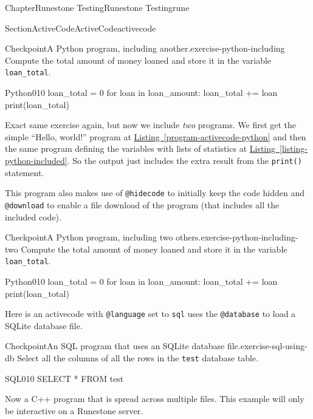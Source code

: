 \documentclass[oneside,10pt,]{book}
\newcommand{\xreffont}{\relax}
\newcommand{\mono}[1]{\texttt{#1}}
\numberwithin{equation}{section}
\begin{document}
\begin{chapterptx}{Chapter}{Runestone Testing}{}{Runestone Testing}{}{}{rune}
\begin{sectionptx}{Section}{ActiveCode}{}{ActiveCode}{}{}{activecode}
\begin{inlineexercise}{Checkpoint}{A Python program, including another.}{exercise-python-including}%
Compute the total amount of money loaned and store it in the variable \mono{loan\_total}.%
\begin{program}{Python}{0}{1}{0}
loan_total = 0
for loan in loan_amount:
    loan_total += loan
print(loan_total)
\end{program}
\end{inlineexercise}%
Exact same exercise again, but now we include \emph{two} programs.  We first get the simple ``Hello, world!'' program at \hyperref[program-activecode-python]{Listing~{\xreffont\ref{program-activecode-python}}} and then the same program defining the variables with lists of statistics at \hyperref[listing-python-included]{Listing~{\xreffont\ref{listing-python-included}}}.  So the output just includes the extra result from the \mono{print()} statement.%
\par
This program also makes use of \mono{@hidecode} to initially keep the code hidden and \mono{@download} to enable a file download of the program (that includes all the included code).%
\begin{inlineexercise}{Checkpoint}{A Python program, including two others.}{exercise-python-including-two}%
Compute the total amount of money loaned and store it in the variable \mono{loan\_total}.%
\begin{program}{Python}{0}{1}{0}
loan_total = 0
for loan in loan_amount:
    loan_total += loan
print(loan_total)
\end{program}
\end{inlineexercise}%
Here is an activecode with \mono{@language} set to \mono{sql} uses the \mono{@database} to load a SQLite database file.%
\begin{inlineexercise}{Checkpoint}{An SQL program that uses an SQLite database file.}{exercise-sql-using-db}%
Select all the columns of all the rows in the \mono{test} database table.%
\begin{program}{SQL}{0}{1}{0}
SELECT * FROM test
\end{program}
\end{inlineexercise}%
Now a C++ program that is spread across multiple files. This example will only be interactive on a Runestone server.%
\par

\end{sectionptx}
\end{chapterptx}
\end{document}
